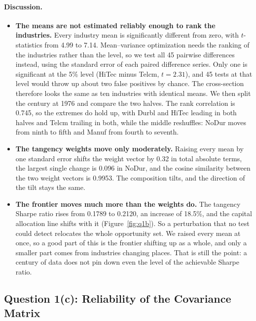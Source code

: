 \documentclass[11pt]{article}
\begin{document}
\paragraph{Discussion.}
\begin{itemize}
\setlength{\itemsep}{6pt}\setlength{\parskip}{0pt}

\item \textbf{The means are not estimated reliably enough to rank the
industries.} Every industry mean is significantly different from zero, with
$t$-statistics from 4.99 to 7.14. Mean--variance optimization needs the
ranking of the industries rather than the level, so we test all 45 pairwise
differences instead, using the standard error of each paired difference
series. Only one is significant at the 5\% level (HiTec minus Telcm,
$t = 2.31$), and 45 tests at that level would throw up about two false
positives by chance. The cross-section therefore looks the same as ten
industries with identical means. We then split the century at 1976 and compare
the two halves. The rank correlation is 0.745, so the extremes do hold up,
with Durbl and HiTec leading in both halves and Telcm trailing in both, while
the middle reshuffles: NoDur moves from ninth to fifth and Manuf from fourth
to seventh.

\item \textbf{The tangency weights move only moderately.} Raising every mean
by one standard error shifts the weight vector by 0.32 in total absolute
terms, the largest single change is 0.096 in NoDur, and the cosine similarity
between the two weight vectors is 0.9953. The composition tilts, and the
direction of the tilt stays the same.

\item \textbf{The frontier moves much more than the weights do.} The tangency
Sharpe ratio rises from 0.1789 to 0.2120, an increase of 18.5\%, and the
capital allocation line shifts with it (Figure~\ref{fig:q1b}). So a
perturbation that no test could detect relocates the whole opportunity set. We
raised every mean at once, so a good part of this is the frontier shifting up
as a whole, and only a smaller part comes from industries changing places.
That is still the point: a century of data does not pin down even the level of
the achievable Sharpe ratio.

\end{itemize}

\subsection{Question 1(c): Reliability of the Covariance Matrix}
\end{document}
